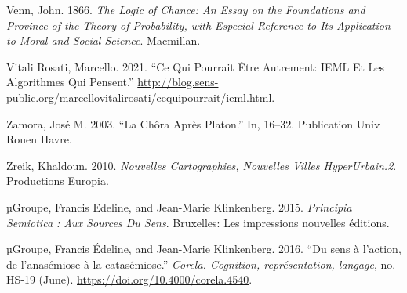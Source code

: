\documentclass[
  letterpaper,
  DIV=11,
  numbers=noendperiod]{scrreprt}
\newlength{\cslhangindent}
\newlength{\cslentryspacingunit} %
\newenvironment{CSLReferences}[2] %
 {%
  \setlength{\parindent}{0pt}
  \ifodd #1
  \let\oldpar\par
  \def\par{\hangindent=\cslhangindent\oldpar}
  \fi
  \setlength{\parskip}{#2\cslentryspacingunit}
 }%
 {}
\begin{document}
\begin{CSLReferences}{1}{0}
\leavevmode{}%
Venn, John. 1866. \emph{The Logic of Chance: An Essay on the Foundations
and Province of the Theory of Probability, with Especial Reference to
Its Application to Moral and Social Science}. Macmillan.

\leavevmode{}%
Vitali Rosati, Marcello. 2021. {``Ce Qui Pourrait Être Autrement: IEML
Et Les Algorithmes Qui Pensent.''}
\url{http://blog.sens-public.org/marcellovitalirosati/cequipourrait/ieml.html}.

\leavevmode{}%
Zamora, José M. 2003. {``La Chôra Après Platon.''} In, 16--32.
Publication Univ Rouen Havre.

\leavevmode{}%
Zreik, Khaldoun. 2010. \emph{Nouvelles Cartographies, Nouvelles Villes
HyperUrbain.2}. Productions Europia.

\leavevmode{}%
µGroupe, Francis Edeline, and Jean-Marie Klinkenberg. 2015.
\emph{Principia Semiotica : Aux Sources Du Sens}. Bruxelles: Les
impressions nouvelles éditions.

\leavevmode{}%
µGroupe, Francis Édeline, and Jean-Marie Klinkenberg. 2016. {``Du sens à
l{'}action, de l{'}anasémiose à la catasémiose.''} \emph{Corela.
Cognition, représentation, langage}, no. HS-19 (June).
\url{https://doi.org/10.4000/corela.4540}.

\end{CSLReferences}
\end{document}
